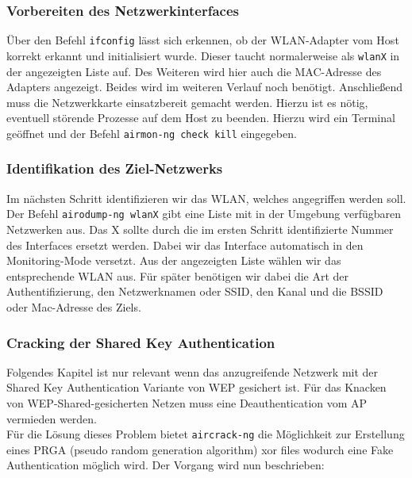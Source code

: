	\subsubsection{Vorbereiten des Netzwerkinterfaces}
	Über den Befehl \colorbox{altgray}{\lstinline|ifconfig|} lässt sich erkennen, ob der WLAN-Adapter vom Host korrekt erkannt und initialisiert wurde. Dieser taucht normalerweise als \colorbox{altgray}{\lstinline|wlanX|} in der angezeigten Liste auf. Des Weiteren wird hier auch die MAC-Adresse des Adapters angezeigt. Beides wird im weiteren Verlauf noch benötigt.
	Anschließend muss die Netzwerkkarte einsatzbereit gemacht werden. Hierzu ist es nötig, eventuell
	störende Prozesse auf dem Host zu beenden. Hierzu wird ein Terminal geöffnet und der
	Befehl \colorbox{altgray}{\lstinline|airmon-ng check kill|} eingegeben.

	\subsubsection{Identifikation des Ziel-Netzwerks}
	Im nächsten Schritt identifizieren wir das WLAN, welches angegriffen werden soll. Der Befehl \colorbox{altgray}{\lstinline|airodump-ng wlanX|} gibt eine Liste mit in der Umgebung verfügbaren Netzwerken aus. Das X sollte durch die im ersten Schritt identifizierte Nummer des Interfaces ersetzt werden.
	Dabei wir das Interface automatisch in den Monitoring-Mode versetzt. Aus der angezeigten Liste wählen wir das entsprechende WLAN aus. Für später benötigen
	wir dabei die Art der Authentifizierung, den Netzwerknamen oder SSID, den Kanal und die BSSID oder Mac-Adresse des
	Ziels.

	\subsubsection{Cracking der Shared Key Authentication}
	Folgendes Kapitel ist nur relevant wenn das anzugreifende Netzwerk mit der Shared Key Authentication Variante von WEP gesichert ist. Für das Knacken von WEP-Shared-gesicherten Netzen muss eine Deauthentication vom AP vermieden werden. \\
	Für die Lösung dieses Problem bietet \colorbox{altgray}{\lstinline|aircrack-ng|} die Möglichkeit zur Erstellung eines PRGA (pseudo random generation algorithm) xor files wodurch eine Fake Authentication möglich wird. Der Vorgang wird nun beschrieben:

